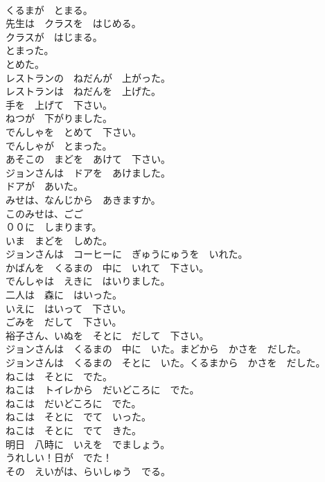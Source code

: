 \documentclass[8pt]{extreport}
\begin{document}
\begin{CJK}{UTF8}{min}
\\	くるまが　とまる。	
\\	先生は　クラスを　はじめる。	
\\	クラスが　はじまる。	
\\	とまった。	
\\	とめた。	
\\	レストランの　ねだんが　上がった。	
\\	レストランは　ねだんを　上げた。	
\\	手を　上げて　下さい。	
\\	ねつが　下がりました。	
\\	でんしゃを　とめて　下さい。	
\\	でんしゃが　とまった。	
\\	あそこの　まどを　あけて　下さい。	
\\	ジョンさんは　ドアを　あけました。	
\\	ドアが　あいた。	
\\	みせは、なんじから　あきますか。	
\\	このみせは、ごご　
\\	００に　しまります。	
\\	いま　まどを　しめた。	
\\	ジョンさんは　コーヒーに　ぎゅうにゅうを　いれた。	
\\	かばんを　くるまの　中に　いれて　下さい。	
\\	でんしゃは　えきに　はいりました。	
\\	二人は　森に　はいった。	
\\	いえに　はいって　下さい。	
\\	ごみを　だして　下さい。	
\\	裕子さん、いぬを　そとに　だして　下さい。	
\\	ジョンさんは　くるまの　中に　いた。まどから　かさを　だした。	
\\	ジョンさんは　くるまの　そとに　いた。くるまから　かさを　だした。	
\\	ねこは　そとに　でた。	
\\	ねこは　トイレから　だいどころに　でた。	
\\	ねこは　だいどころに　でた。	
\\	ねこは　そとに　でて　いった。	
\\	ねこは　そとに　でて　きた。	
\\	明日　八時に　いえを　でましょう。	
\\	うれしい！日が　でた！	
\\	その　えいがは、らいしゅう　でる。	

\end{CJK}
\end{document}
